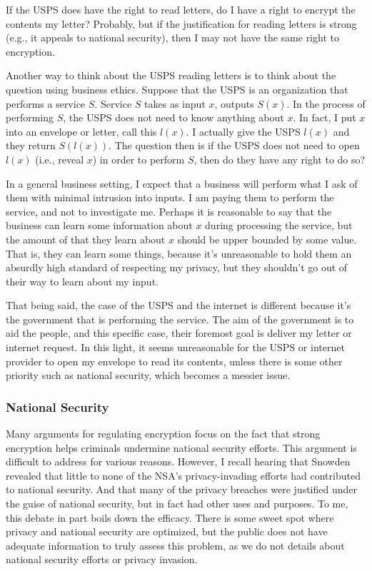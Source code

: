 \documentclass[11pt]{article}
\begin{document}
If the USPS does have the right to read letters, do I have a right to encrypt the contents my letter?
Probably, but if the justification for reading letters is strong (e.g., it appeals to national security), then I may not have the same right to encryption.

Another way to think about the USPS reading letters is to think about the question using business ethics.
Suppose that the USPS is an organization  that performs a service $S$.
Service $S$ takes as input $x$, outputs $S(x)$.
In the process of performing $S$, the USPS does not need to know anything about $x$.
In fact, I put $x$ into an envelope or letter, call this $l(x)$.
I actually give the USPS $l(x)$ and they return $S(l(x))$.
The question then is if the USPS does not need to open $l(x)$ (i.e., reveal $x$) in order to perform $S$, then do they have any right to do so?

In a general business setting, I expect that a business will perform what I ask of them with minimal intrusion into inputs.
I am paying them to perform the service, and not to investigate me.
Perhaps it is reasonable to say that the business can learn some information about $x$ during processing the service, but the amount of that they learn about $x$ should be upper bounded by some value.
That is, they can learn some things, because it's unreasonable to hold them an absurdly high standard of respecting my privacy, but they shouldn't go out of their way to learn about my input.

That being said, the case of the USPS and the internet is different because it's the government that is performing the service.
The aim of the government is to aid the people, and this specific case, their foremost goal is deliver my letter or internet request.
In this light, it seems unreasonable for the USPS or internet provider to open my envelope to read its contents, unless there is some other priority such as national security, which becomes a messier issue.

\subsubsection{National Security}
Many arguments for regulating encryption focus on the fact that strong encryption helps criminals undermine national security efforts.
This argument is difficult to address for various reasons.
However, I recall hearing that Snowden revealed that little to none of the NSA's privacy-invading efforts had contributed to national security.
And that many of the privacy breaches were justified under the guise of national security, but in fact had other uses and purposes.
To me, this debate in part boils down the efficacy.
There is some sweet spot where privacy and national security are optimized, but the public does not have adequate information to truly assess this problem, as we do not details about national security efforts or privacy invasion.
\end{document}
